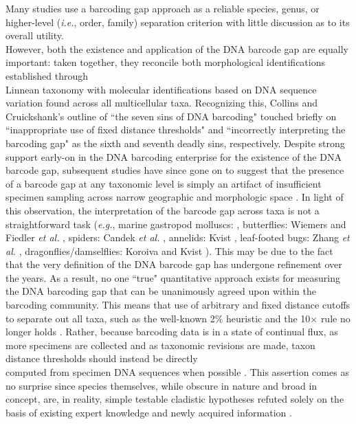 Many studies use a barcoding gap approach as a reliable species, genus, or higher-level (\textit{i.e.}, order, family) separation criterion with little discussion as to its overall utility. \\ However, both the existence and application of the DNA barcode gap are equally important: taken together, they reconcile both morphological identifications established through \\ Linnean taxonomy with molecular identifications based on DNA sequence variation found across all multicellular taxa. Recognizing this, Collins and Cruickshank's \cite{collins2013seven} outline of ``the seven sins of DNA barcoding" touched briefly on ``inappropriate use of fixed distance thresholds" and ``incorrectly interpreting the barcoding gap" as the sixth and seventh deadly sins, respectively. Despite strong support early-on in the DNA barcoding enterprise for the existence of the DNA barcode gap, subsequent studies have since gone on to suggest that the presence of a barcode gap at any taxonomic level is simply an artifact of insufficient specimen sampling across narrow geographic and morphologic space \cite{bergsten2012effect, candek2015dna, dasmahapatra2010mitochondrial}. In light of this observation, the interpretation of the barcode gap across taxa is not a straightforward task (\textit{e.g.}, marine gastropod molluscs: \cite{meyer2005dna}, butterflies: Wiemers and Fiedler \textit{et al.} \cite{wiemers2007does}, spiders: Candek \textit{et al.} \cite{candek2015dna}, annelids: Kvist \cite{kvist2017does}, leaf-footed bugs: Zhang \textit{et al.} \cite{zhang2017species}, dragonflies/damselflies: Koroiva and Kvist \cite{koroiva2018estimating}). This may be due to the fact that the very definition of the DNA barcode gap has undergone refinement over the years. As a result, no one ``true" quantitative approach exists for measuring the DNA barcoding gap that can be unanimously agreed upon within the barcoding community. This means that use of arbitrary and fixed distance cutoffs to separate out all taxa, such as the well-known 2\% heuristic \cite{hebert2003biological, hebert2003barcoding} and the 10$\times$ rule \cite{hebert2004identification} no longer holds \cite{collins2014known, zhang2017species}. Rather, because barcoding data is in a state of continual flux, as more specimens are collected and as taxonomic revisions are made, taxon distance thresholds should instead be directly \\ computed from specimen DNA sequences when possible \cite{collins2013seven, young2017barcode}. This assertion comes as no surprise since species themselves, while obscure in nature and broad in concept, are, in reality, simple testable cladistic hypotheses refuted solely on the basis of existing expert knowledge and newly acquired information \cite{pante2015species}.



